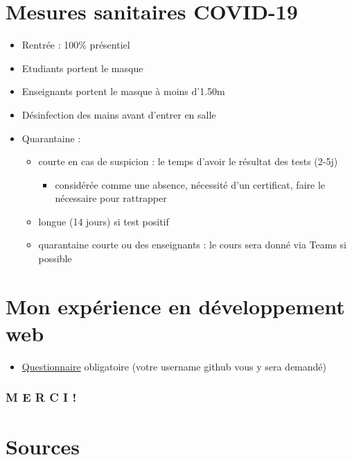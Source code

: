 \hypertarget{mesures-sanitaires-covid-19}{%
\section{Mesures sanitaires
COVID-19}\label{mesures-sanitaires-covid-19}}

\begin{itemize}
\tightlist
\item
  Rentrée : 100\% présentiel
\item
  Etudiants portent le masque
\item
  Enseignants portent le masque à moins d'1.50m
\item
  Désinfection des mains avant d'entrer en salle
\item
  Quarantaine :

  \begin{itemize}
  \tightlist
  \item
    courte en cas de suspicion : le temps d'avoir le résultat des tests
    (2-5j)

    \begin{itemize}
    \tightlist
    \item
      considérée comme une absence, nécessité d'un certificat, faire le
      nécessaire pour rattrapper
    \end{itemize}
  \item
    longue (14 jours) si test positif
  \item
    quarantaine courte ou des enseignants : le cours sera donné via
    Teams si possible
  \end{itemize}
\end{itemize}

\hypertarget{mon-expuxe9rience-en-duxe9veloppement-web}{%
\section{Mon expérience en développement
web}\label{mon-expuxe9rience-en-duxe9veloppement-web}}

\begin{itemize}
\tightlist
\item
  \href{https://docs.google.com/spreadsheet/viewform?formkey=dDg5Znh5akRBV1hPbC1qYlVRV3BONFE6MQ}{Questionnaire}
  obligatoire (votre username github vous y sera demandé)
\end{itemize}

\hypertarget{m-e-r-c-i}{%
\subsubsection{M E R C I !}\label{m-e-r-c-i}}

\hypertarget{sources}{%
\section{Sources}\label{sources}}
